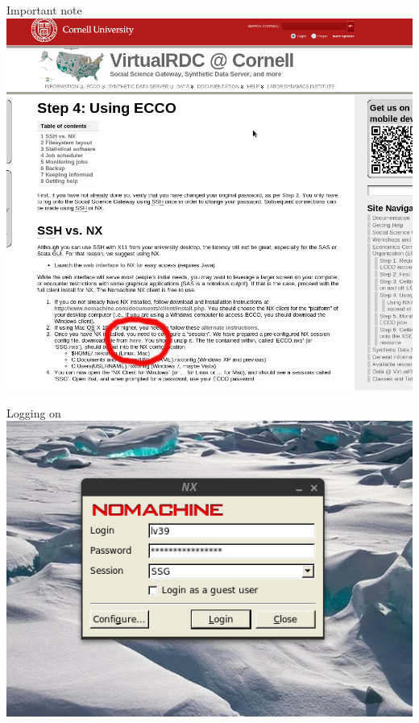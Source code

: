 \documentclass[xcolor=table,compress]{beamer}
\begin{document}
\begin{frame}{Important note}
\includegraphics[height=.7\textheight]{nx-ecco-key.png}
\end{frame}


\begin{frame}{Logging on}
\centering
\includegraphics[height=.7\textheight]{nx-login-box.png}
\end{frame}
\end{document}
